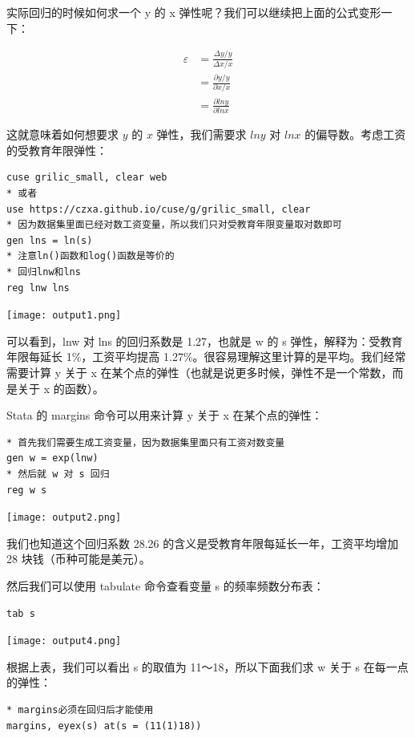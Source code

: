 \documentclass[cn,fancy,blue,11pt]{elegantbook}
\begin{document}
实际回归的时候如何求一个 y 的 x 弹性呢？我们可以继续把上面的公式变形一下：

\begin{align}
  \varepsilon & = \frac{\Delta y / y}{\Delta x / x} \\
  & = \frac{\partial y / y}{\partial x / x} \\
  & = \frac{\partial lny}{\partial lnx}
\end{align}

这就意味着如何想要求 \(y\) 的 \(x\) 弹性，我们需要求 \(lny\) 对 \(lnx\) 的偏导数。考虑工资的受教育年限弹性：

\begin{lstlisting}
cuse grilic_small, clear web
* 或者
use https://czxa.github.io/cuse/g/grilic_small, clear
* 因为数据集里面已经对数工资变量，所以我们只对受教育年限变量取对数即可
gen lns = ln(s)
* 注意ln()函数和log()函数是等价的
* 回归lnw和lns
reg lnw lns
\end{lstlisting}

\noindent\texttt{[image: output1.png]}

可以看到，lnw 对 lns 的回归系数是 1.27，也就是 w 的 s 弹性，解释为：受教育年限每延长 1\%，工资平均提高 1.27\%。很容易理解这里计算的是平均。我们经常需要计算 y 关于 x 在某个点的弹性（也就是说更多时候，弹性不是一个常数，而是关于 x 的函数）。

Stata 的 margins 命令可以用来计算 y 关于 x 在某个点的弹性：

\begin{lstlisting}
* 首先我们需要生成工资变量，因为数据集里面只有工资对数变量
gen w = exp(lnw)
* 然后就 w 对 s 回归
reg w s
\end{lstlisting}

\noindent\texttt{[image: output2.png]}

我们也知道这个回归系数 28.26 的含义是受教育年限每延长一年，工资平均增加 28 块钱（币种可能是美元）。

然后我们可以使用 tabulate 命令查看变量 s 的频率频数分布表：

\begin{lstlisting}
tab s
\end{lstlisting}

\noindent\texttt{[image: output4.png]}

根据上表，我们可以看出 s 的取值为 11～18，所以下面我们求 w 关于 s 在每一点的弹性：

\begin{lstlisting}
* margins必须在回归后才能使用
margins, eyex(s) at(s = (11(1)18))
\end{lstlisting}
\end{document}

